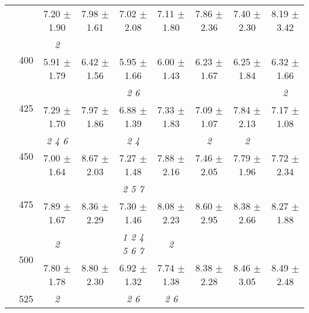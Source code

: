 \begin{table}[h]
{\begin{tabular}{
        ccccccccc}
 & & \cellcolor[HTML]{EFEFEF} 7.20 $\pm$ 1.90& \cellcolor[HTML]{EFEFEF} 7.98 $\pm$ 1.61& \cellcolor[HTML]{EFEFEF} 7.02 $\pm$ 2.08& \cellcolor[HTML]{EFEFEF} 7.11 $\pm$ 1.80& \cellcolor[HTML]{EFEFEF} 7.86 $\pm$ 2.36& \cellcolor[HTML]{EFEFEF} 7.40 $\pm$ 2.30& \cellcolor[HTML]{EFEFEF} 8.19 $\pm$ 3.42 \\ 
 & \multirow{2}{*}{400}& \textit{ 2 }& & & & & &  \\ 
 & & 5.91 $\pm$ 1.79& 6.42 $\pm$ 1.56& 5.95 $\pm$ 1.66& 6.00 $\pm$ 1.43& 6.23 $\pm$ 1.67& 6.25 $\pm$ 1.84& 6.32 $\pm$ 1.66 \\ 
 & \multirow{2}{*}{425}& \cellcolor[HTML]{EFEFEF} & \cellcolor[HTML]{EFEFEF} & \cellcolor[HTML]{EFEFEF} \textit{ 2 6 }& \cellcolor[HTML]{EFEFEF} & \cellcolor[HTML]{EFEFEF} & \cellcolor[HTML]{EFEFEF} & \cellcolor[HTML]{EFEFEF} \textit{ 2 } \\ 
 & & \cellcolor[HTML]{EFEFEF} 7.29 $\pm$ 1.70& \cellcolor[HTML]{EFEFEF} 7.97 $\pm$ 1.86& \cellcolor[HTML]{EFEFEF} 6.88 $\pm$ 1.39& \cellcolor[HTML]{EFEFEF} 7.33 $\pm$ 1.83& \cellcolor[HTML]{EFEFEF} 7.09 $\pm$ 1.07& \cellcolor[HTML]{EFEFEF} 7.84 $\pm$ 2.13& \cellcolor[HTML]{EFEFEF} 7.17 $\pm$ 1.08 \\ 
 & \multirow{2}{*}{450}& \textit{ 2 4 6 }& & \textit{ 2 4 }& & \textit{ 2 }& \textit{ 2 }&  \\ 
 & & 7.00 $\pm$ 1.64& 8.67 $\pm$ 2.03& 7.27 $\pm$ 1.48& 7.88 $\pm$ 2.16& 7.46 $\pm$ 2.05& 7.79 $\pm$ 1.96& 7.72 $\pm$ 2.34 \\ 
 & \multirow{2}{*}{475}& \cellcolor[HTML]{EFEFEF} & \cellcolor[HTML]{EFEFEF} & \cellcolor[HTML]{EFEFEF} \textit{ 2 5 7 }& \cellcolor[HTML]{EFEFEF} & \cellcolor[HTML]{EFEFEF} & \cellcolor[HTML]{EFEFEF} & \cellcolor[HTML]{EFEFEF}  \\ 
 & & \cellcolor[HTML]{EFEFEF} 7.89 $\pm$ 1.67& \cellcolor[HTML]{EFEFEF} 8.36 $\pm$ 2.29& \cellcolor[HTML]{EFEFEF} 7.30 $\pm$ 1.46& \cellcolor[HTML]{EFEFEF} 8.08 $\pm$ 2.23& \cellcolor[HTML]{EFEFEF} 8.60 $\pm$ 2.95& \cellcolor[HTML]{EFEFEF} 8.38 $\pm$ 2.66& \cellcolor[HTML]{EFEFEF} 8.27 $\pm$ 1.88 \\ 
 & \multirow{2}{*}{500}& \textit{ 2 }& & \textit{ 1 2 4 5 6 7 }& \textit{ 2 }& & &  \\ 
 & & 7.80 $\pm$ 1.78& 8.80 $\pm$ 2.30& 6.92 $\pm$ 1.32& 7.74 $\pm$ 1.38& 8.38 $\pm$ 2.28& 8.46 $\pm$ 3.05& 8.49 $\pm$ 2.48 \\ 
 & \multirow{2}{*}{525}& \cellcolor[HTML]{EFEFEF} \textit{ 2 }& \cellcolor[HTML]{EFEFEF} & \cellcolor[HTML]{EFEFEF} \textit{ 2 6 }& \cellcolor[HTML]{EFEFEF} \textit{ 2 6 }& \cellcolor[HTML]{EFEFEF} & \cellcolor[HTML]{EFEFEF} & \cellcolor[HTML]{EFEFEF}  \\ 

\end{tabular}}
\end{table}
